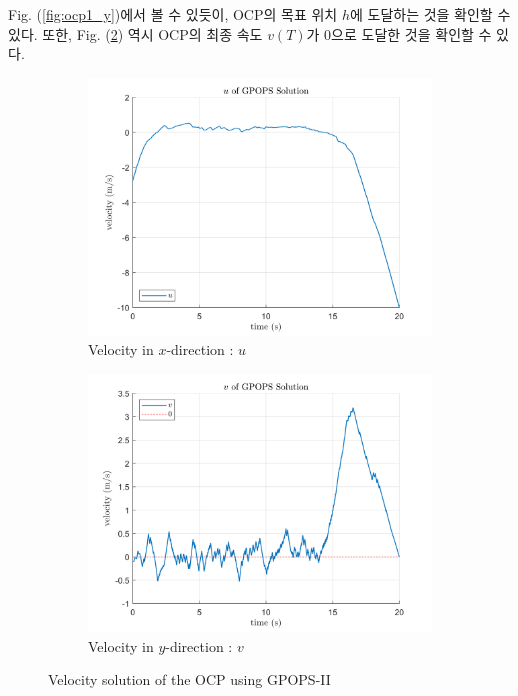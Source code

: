 Fig. (\ref{fig:ocp1_y})에서 볼 수 있듯이, OCP의 목표 위치 $h$에 도달하는 것을 확인할 수 있다.
또한, Fig. (\ref{fig:ocp1_v}) 역시 OCP의 최종 속도 $v(T)$가 0으로 도달한 것을 확인할 수 있다.

\begin{figure}[ht]
    \centering
    \begin{subfigure}[b]{0.49\linewidth}
        \includegraphics[width=\linewidth]{figures/SolU.png}
        \caption{Velocity in $x$-direction : $u$}
        \label{fig:ocp1_u}
    \end{subfigure}
    \hfill
    \begin{subfigure}[b]{0.49\linewidth}
        \includegraphics[width=\linewidth]{figures/SolV.png}
        \caption{Velocity in $y$-direction : $v$}
        \label{fig:ocp1_v}
    \end{subfigure}
    \caption{Velocity solution of the OCP using GPOPS-II}
    \label{fig:ocp1_vel}    
\end{figure}

